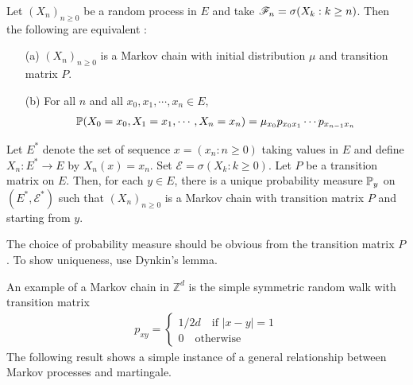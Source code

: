 \documentclass[10pt,a4paper]{report}
\newenvironment{proof}
{\begin{changemargin}{1cm}{0.5cm} 
	}%
	{\end{changemargin}
}
\begin{document}
 Let $(X_n)_{n\geq 0}$ be a random process in $E$ and take $\mathscr{F}_n = \sigma (X_k : k\geq n)$. Then the following are equivalent :
\begin{itemize}
\item[(a)] $(X_n)_{n\geq 0}$ is a Markov chain with initial distribution $\mu$ and transition matrix $P$.
\item[(b)] For all $n$ and all $x_0,x_1,\cdots,x_n\in E$,
\begin{align*}
\mathbb{P}(X_0 = x_0, X_1=x_1,\cdots,X_n=x_n) = \mu_{x_0} p_{x_0 x_1} \cdots p_{x_{n-1}x_n}
\end{align*}
\end{itemize}
\s

 Let $E^*$ denote the set of sequence $x=(x_n : n\geq 0)$ taking values in $E$ and define $X_n : E^* \rightarrow E$ by $X_n(x) = x_n$. Set $\mathscr{E} = \sigma (X_k : k\geq 0)$. Let $P$ be a transition matrix on $E$. Then, for each $y\in E$, there is a unique probability measure $\mathbb{P}_y$ on $(E^*,\mathscr{E}^*)$ such that $(X_n)_{n\geq 0}$ is a Markov chain with transition matrix $P$ and starting from $y$.
\begin{proof}
\pf The choice of probability measure should be obvious from the transition matrix $P$. To show uniqueness, use Dynkin's lemma.
\end{proof}

\s

An example of a Markov chain in $\mathbb{Z}^d$ is the simple symmetric random walk with transition matrix
\begin{align*}
p_{xy} = \begin{cases}
1/2d \quad \text{if } |x-y| =1 \\
0 \quad \text{otherwise}
\end{cases}
\end{align*}
The following result shows a simple instance of a general relationship between Markov processes and martingale.
\s
\end{document}
